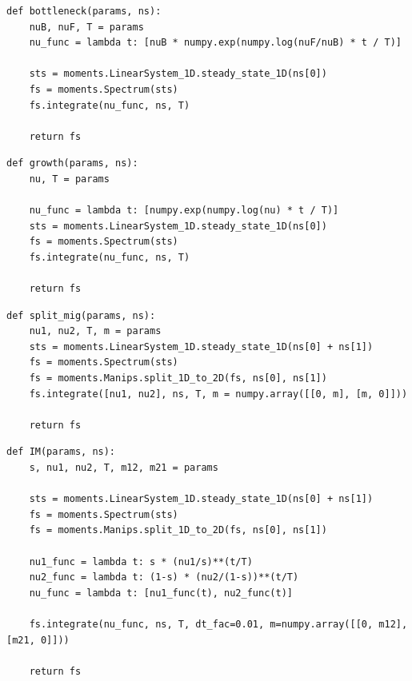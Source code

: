 \documentclass[12pt]{article}
\makeatletter
\newcommand{\py}[1]{\lstinline[language=Python, showstringspaces=False]@#1@}
\makeatother
\begin{document}
\clearpage

\begin{lstlisting}[caption={\textbf{Bottleneck:} At time \py{TF} + \py{TB} in the past, an equilibrium population goes through a bottleneck of depth \py{nuB}, recovering to relative size \py{nuF}.}, float, label={lst:bottleneck}]
def bottleneck(params, ns):
    nuB, nuF, T = params
    nu_func = lambda t: [nuB * numpy.exp(numpy.log(nuF/nuB) * t / T)]

    sts = moments.LinearSystem_1D.steady_state_1D(ns[0])
    fs = moments.Spectrum(sts)
    fs.integrate(nu_func, ns, T)

    return fs
\end{lstlisting}

\begin{lstlisting}[caption={\textbf{Exponential growth:} At time \py{T} in the past, an equilibrium population begins growing exponentially, reaching size \py{nu} at present.}, float]
def growth(params, ns):
    nu, T = params

    nu_func = lambda t: [numpy.exp(numpy.log(nu) * t / T)]
    sts = moments.LinearSystem_1D.steady_state_1D(ns[0])
    fs = moments.Spectrum(sts)
    fs.integrate(nu_func, ns, T)

    return fs
\end{lstlisting}

\begin{lstlisting}[caption={\textbf{Split with migration:} At time \py{T} in the past, two population diverge from an equilibrium population, with relative sizes \py{nu1} and \py{nu2} and with symmetric migration at rate \py{m}.}, float]
def split_mig(params, ns):
    nu1, nu2, T, m = params
    sts = moments.LinearSystem_1D.steady_state_1D(ns[0] + ns[1])
    fs = moments.Spectrum(sts)
    fs = moments.Manips.split_1D_to_2D(fs, ns[0], ns[1])
    fs.integrate([nu1, nu2], ns, T, m = numpy.array([[0, m], [m, 0]]))

    return fs
\end{lstlisting}

\begin{lstlisting}[caption={\textbf{Two-population isolation-with-migration:} The ancestral population splits into two, with a fraction \py{s} going into pop 1 and fraction \py{1-s} into pop 2. The populations then grow exponentially, with asymmetric migration allowed between them.}, float]
def IM(params, ns):
    s, nu1, nu2, T, m12, m21 = params

    sts = moments.LinearSystem_1D.steady_state_1D(ns[0] + ns[1])
    fs = moments.Spectrum(sts)
    fs = moments.Manips.split_1D_to_2D(fs, ns[0], ns[1])
    
    nu1_func = lambda t: s * (nu1/s)**(t/T)
    nu2_func = lambda t: (1-s) * (nu2/(1-s))**(t/T)
    nu_func = lambda t: [nu1_func(t), nu2_func(t)]

    fs.integrate(nu_func, ns, T, dt_fac=0.01, m=numpy.array([[0, m12], [m21, 0]]))

    return fs
\end{lstlisting}
\end{document}
